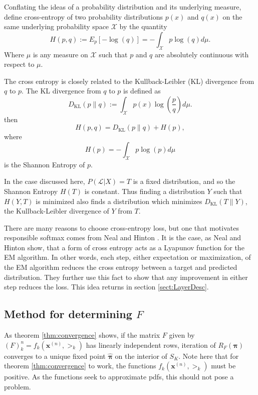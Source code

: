 Conflating the ideas of a probability distribution and its underlying measure, define cross-entropy of two probability distributions $p(x)$ and $q(x)$ on the same underlying probability space 
$\mathcal{X}$ by the quantity 
\begin{equation}\label{eqn:crossent}
H(p,q):= E_p[-\log (q)] = -\int_{\mathcal{X}} p\log (q) d\mu.
\end{equation}
Where $\mu$ is any measure on $\mathcal{X}$ such that $p$ and $q$ are absolutely
continuous with respect to $\mu$.

The cross entropy is closely related to the Kullback-Leibler (KL) divergence from $q$ to $p$.
The KL divergence  from $q$ to $p$ is defined as
\begin{equation}\label{eqn:kldiverge}
D_{\text{KL}}(p\parallel q):=\int_{\mathcal{X}}p(x)\log\left(\dfrac{p}{q}\right)d\mu.
\end{equation}
then  
\begin{equation}\label{eqn:crossentdiverge}
H(p,q)= D_{\text{KL}}(p\parallel q)+H(p),
\end{equation}
where 
\begin{equation}\label{eqn:shannonent}
H(p) = -\int_{\mathcal{X}}p\log(p)d\mu
\end{equation}
is the Shannon Entropy of $p$.

In the case discussed here, $P(\mathcal{L}|X)=T$ is a fixed distribution, and so the
Shannon Entropy $H(T)$ is constant.  Thus finding a distribution $Y$ such that 
$H(Y,T)$ is minimized also finds a distribution which minimizes \( D_{\text{KL}}(T\parallel Y) \), the Kullback-Leibler divergence of $Y$ from $T$.


There are many reasons to choose cross-entropy loss, but one that motivates responsible softmax
comes from Neal and Hinton \cite{NealHintonEM1999}.  It is the case, as Neal and Hinton show, that a form
of cross entropy acts as a Lyapunov function for the EM algorithm. In other words, each
step, either expectation or maximization, of the EM algorithm reduces the cross entropy 
between a target and predicted distribution.  They further use this fact to show that any 
improvement in either step reduces the loss. This idea returns in section \ref{sect:LayerDesc}.

\subsection{Method for determining \( F \)}
As theorem \ref{thm:convergence} shows, if the matrix \( F \) given by \((F)_k^n=f_k(\bm x^{(n)},\bm\gt_k)\) has linearly independent rows, iteration of \( R_F(\bm\pi) \) converges to a unique fixed point \( \hat{\bm \pi} \) on the interior of \( S_K \). Note here that for theorem \ref{thm:convergence} to work, the functions \( f_k(\bm x^{(n)},\bm\gt_k) \) must be positive. As the functions seek to approximate pdfs, this should not pose a problem.  

